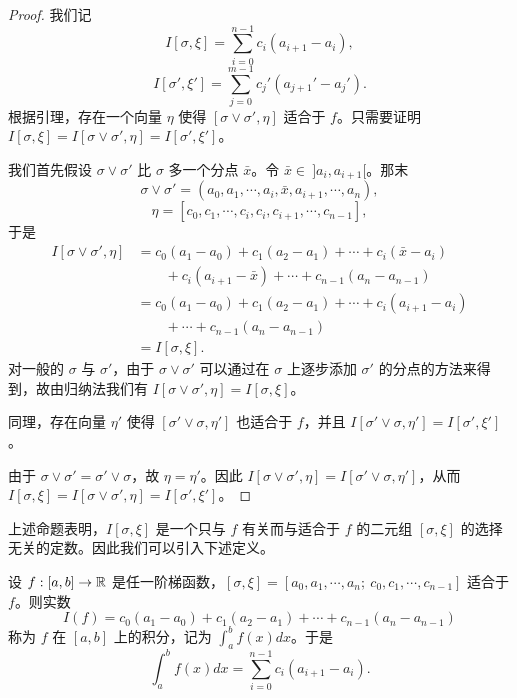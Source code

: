 \begin{proof}

	我们记
	\[
	I[\sigma,\xi]=\sum_{i=0}^{n-1}c_i(a_{i+1}-a_i),
	\]
	\[
	I[\sigma',\xi']=\sum_{j=0}^{m-1}c_j'(a_{j+1}'-a_j').
	\]
	根据引理，存在一个向量 \(\eta\) 使得 \([\sigma\vee\sigma',\eta]\) 适合于 \(f\)。只需要证明 \(I[\sigma,\xi]=I[\sigma\vee\sigma',\eta]=I[\sigma',\xi']\)。

	我们首先假设 \(\sigma\vee\sigma'\) 比 \(\sigma\) 多一个分点 \(\bar x\)。令 \(\bar x\in\ ]a_i,a_{i+1}[\)。那末
	\[
	\sigma\vee\sigma'=(a_0,a_1,\cdots,a_i,\bar x,a_{i+1},\cdots,a_n),
	\]
	\[
	\eta=[c_0,c_1,\cdots,c_i,c_i,c_{i+1},\cdots,c_{n-1}],
	\]
	于是
	\[
	\begin{aligned}
	I[\sigma\vee\sigma',\eta]&=c_0(a_1-a_0)+c_1(a_2-a_1)+\cdots+c_i(\bar x-a_i)\\
	&\qquad+c_i(a_{i+1}-\bar x)+\cdots+c_{n-1}(a_n-a_{n-1})\\
	&=c_0(a_1-a_0)+c_1(a_2-a_1)+\cdots+c_i(a_{i+1}-a_i)\\
	&\qquad+\cdots+c_{n-1}(a_n-a_{n-1})\\
	&=I[\sigma,\xi].
	\end{aligned}
	\]
	对一般的 \(\sigma\) 与 \(\sigma'\)，由于 \(\sigma\vee\sigma'\) 可以通过在 \(\sigma\) 上逐步添加 \(\sigma'\) 的分点的方法来得到，故由归纳法我们有 \(I[\sigma\vee\sigma',\eta]=I[\sigma,\xi]\)。

	同理，存在向量 \(\eta'\) 使得 \([\sigma'\vee\sigma,\eta']\) 也适合于 \(f\)，并且 \(I[\sigma'\vee\sigma,\eta']=I[\sigma',\xi']\)。

	由于 \(\sigma\vee\sigma'=\sigma'\vee\sigma\)，故 \(\eta=\eta'\)。因此 \(I[\sigma\vee\sigma',\eta]=I[\sigma'\vee\sigma,\eta']\)，从而 \(I[\sigma,\xi]=I[\sigma\vee\sigma',\eta]=I[\sigma',\xi']\)。

\end{proof}

上述命题表明，\(I[\sigma,\xi]\) 是一个只与 \(f\) 有关而与适合于 \(f\) 的二元组 \([\sigma,\xi]\) 的选择无关的定数。因此我们可以引入下述定义。

\begin{mydef*}{}

	设 \(f:[a,b]\to\mathbb{R}\) 是任一阶梯函数，\([\sigma,\xi]=[a_0,a_1,\cdots,a_n;\ c_0,c_1,\cdots,c_{n-1}]\) 适合于 \(f\)。则实数
	\[
	I(f)=c_0(a_1-a_0)+c_1(a_2-a_1)+\cdots+c_{n-1}(a_n-a_{n-1})
	\]
	称为 \(f\) 在 \([a,b]\) 上的积分，记为 \(\displaystyle\int_a^b f(x)dx\)。于是
	\[
	\int_a^b f(x)dx=\sum_{i=0}^{n-1}c_i(a_{i+1}-a_i).
	\]

\end{mydef*}

